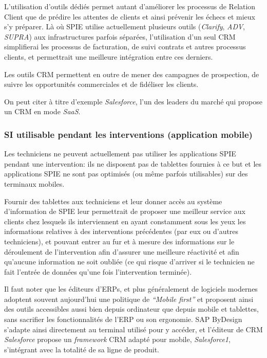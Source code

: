             L'utilisation d'outils dédiés permet autant d'améliorer les processus de Relation Client que de prédire les attentes de clients et ainsi prévenir les échecs et mieux s'y préparer. Là où SPIE utilise actuellement plusieurs outils (\textit{Clarify}, \textit{ADV}, \textit{SUPRA}) aux infrastructures parfois séparées, l'utilisation d'un seul CRM simplifierai les processus de facturation, de suivi contrats et autres processus clients, et permettrait une meilleure intégration entre ces derniers.

            Les outils CRM permettent en outre de mener des campagnes de prospection, de suivre les opportunités commerciales et de fidéliser les clients.

            On peut citer à titre d'exemple \textit{Salesforce}, l'un des leaders du marché qui propose un CRM en mode \textit{SaaS}.

        \subsubsection{SI utilisable pendant les interventions (application mobile)}

            Les techniciens ne peuvent actuellement pas utiliser les applications SPIE pendant une intervention: ils ne disposent pas de tablettes fournies à ce but et les applications SPIE ne sont pas optimisés (ou même parfois utilisables) sur des terminaux mobiles.

            Fournir des tablettes aux techniciens et leur donner accès au système d'information de SPIE leur permettrait de proposer une meilleur service aux clients chez lesquels ils interviennent en ayant constamment sous les yeux les informations relatives à des interventions précédentes (par eux ou d'autres techniciens), et pouvant entrer au fur et à mesure des informations sur le déroulement de l'intervention afin d'assurer une meilleure réactivité et afin qu'aucune information ne soit oubliée (ce qui risque d'arriver si le technicien ne fait l'entrée de données qu'une fois l'intervention terminée).

            Il faut noter que les éditeurs d'ERPs, et plus généralement de logiciels modernes adoptent souvent aujourd'hui une politique de \textit{``Mobile first''} et proposent ainsi des outils accessibles aussi bien depuis ordinateur que depuis mobile et tablettes, sans sacrifier les fonctionnalités de l'ERP ou son ergonomie. SAP ByDesign s'adapte ainsi directement au terminal utilisé pour y accéder, et l'éditeur de CRM \textit{Salesforce} propose un \textit{framework} CRM adapté pour mobile, \textit{Salesforce1}, s'intégrant avec la totalité de sa ligne de produit.


